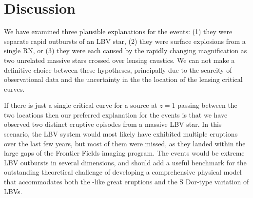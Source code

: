 \section{Discussion}\label{sec:Discussion}

We have examined three plausible explanations for the \spock events:
(1) they were separate rapid outbursts of an LBV star, (2) they were
surface explosions from a single RN, or (3) they were each caused by
the rapidly changing magnification as two unrelated massive stars
crossed over lensing caustics. We can not make a definitive choice
between these hypotheses, principally due to the scarcity of
observational data and the uncertainty in the the location of the
lensing critical curves.

If there is just a single critical curve for a source at $z=1$ passing
between the two \spock locations then our preferred explanation for
the \spock events is that we have observed two distinct eruptive
episodes from a massive LBV star.
In this scenario, the \spock LBV system would most likely
have exhibited multiple eruptions over the last few years, but most of
them were missed, as they landed within the large gaps of the \HST
Frontier Fields imaging program.
The \spock events would be extreme LBV outbursts in several
dimensions, and should add a useful benchmark for the outstanding
theoretical challenge of developing a comprehensive physical model
that accommodates both the \etacar-like great eruptions and the S
Dor-type variation of LBVs.

